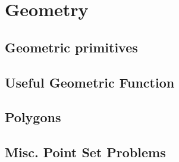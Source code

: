 \chapter{Geometry}

\section{Geometric primitives}

\section{Useful Geometric Function}

\section{Polygons}

\section{Misc. Point Set Problems}
